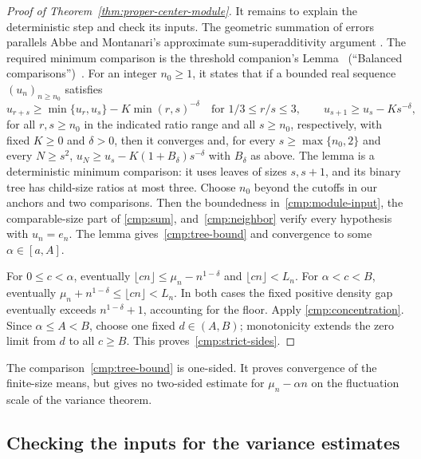 \begin{proof}[Proof of Theorem~\ref{thm:proper-center-module}]
It remains to explain the deterministic step and check its inputs.
The geometric summation of errors parallels Abbe and Montanari's
approximate sum-superadditivity argument
\cite[arXiv version, Lemma~8 and Remark~3]{AM}.  The required minimum
comparison is the threshold companion's Lemma~\ThresholdBalanced{}
(``Balanced comparisons'')~\cite{FixedKThreshold}.  For an integer
$n_0\ge1$, it states that if a bounded real sequence $(u_n)_{n\ge n_0}$
satisfies
\[
 u_{r+s}\ge\min\{u_r,u_s\}-K\min(r,s)^{-\delta}
 \quad\text{for }1/3\le r/s\le3,\qquad
 u_{s+1}\ge u_s-Ks^{-\delta},
\]
for all $r,s\ge n_0$ in the indicated ratio range and all $s\ge n_0$,
respectively, with fixed $K\ge0$ and $\delta>0$, then it converges and,
for every $s\ge\max\{n_0,2\}$ and every $N\ge s^2$,
$u_N\ge u_s-K(1+B_\delta)s^{-\delta}$ with $B_\delta$ as above.
The lemma is a deterministic minimum comparison: it uses leaves of sizes
$s,s+1$, and its binary tree has child-size ratios at most three.
Choose $n_0$ beyond the cutoffs in our anchors and two comparisons.
Then the boundedness in~\eqref{cmp:module-input},
the comparable-size part of \eqref{cmp:sum}, and~\eqref{cmp:neighbor}
verify every hypothesis with $u_n=e_n$. The lemma gives~\eqref{cmp:tree-bound} and convergence to
some $\alpha\in[a,A]$.

For $0\le c<\alpha$, eventually
$\lfloor cn\rfloor\le\mu_n-n^{1-\delta}$ and $\lfloor cn\rfloor<L_n$.
For $\alpha<c<B$, eventually
$\mu_n+n^{1-\delta}\le\lfloor cn\rfloor<L_n$.
In both cases the fixed positive density gap eventually exceeds
$n^{1-\delta}+1$, accounting for the floor.  Apply
\eqref{cmp:concentration}.  Since $\alpha\le A<B$, choose one fixed
$d\in(A,B)$; monotonicity extends the zero limit from $d$ to all
$c\ge B$.  This proves~\eqref{cmp:strict-sides}.
\end{proof}

The comparison~\eqref{cmp:tree-bound} is one-sided.  It proves
convergence of the finite-size means, but gives no two-sided estimate for
$\mu_n-\alpha n$ on the fluctuation scale of the variance theorem.

\subsection{Checking the inputs for the variance estimates}

